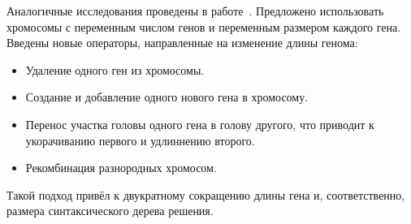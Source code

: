Аналогичные исследования проведены в работе~\cite{journals/acisc/BrowneS10}. Предложено использовать хромосомы с переменным числом генов и переменным размером каждого гена. Введены новые операторы, направленные на изменение длины генома:
\begin{itemize}
  \item Удаление одного ген из хромосомы.
  \item Создание и добавление одного нового гена в хромосому.
  \item Перенос участка головы одного гена в голову другого, что приводит к укорачиванию первого и удлиннению второго.
  \item Рекомбинация разнородных хромосом.
\end{itemize}

Такой подход привёл к двукратному сокращению длины гена и, соответственно, размера синтаксического дерева решения.
